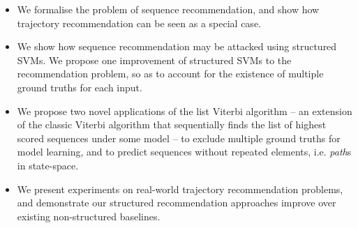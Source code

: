\begin{itemize}[noitemsep,leftmargin=12pt]%
	\item We formalise the problem of sequence recommendation, %
          and show how trajectory recommendation can be seen as a special case. %

	\item We show how sequence recommendation may be attacked using structured SVMs. %
	We propose one improvement of structured SVMs to the recommendation problem, so as to account for the existence of multiple ground truths for each input. %

    \item We propose two novel applications of the list Viterbi algorithm -- an extension of the classic Viterbi algorithm that sequentially finds the list of highest scored sequences under some model --
to exclude multiple ground truths for model learning, %
and to predict sequences without repeated elements, i.e. {\em path}s in state-space. %

	\item We present experiments on real-world trajectory recommendation problems, and demonstrate our structured recommendation approaches improve over existing non-structured baselines. %
\end{itemize}

